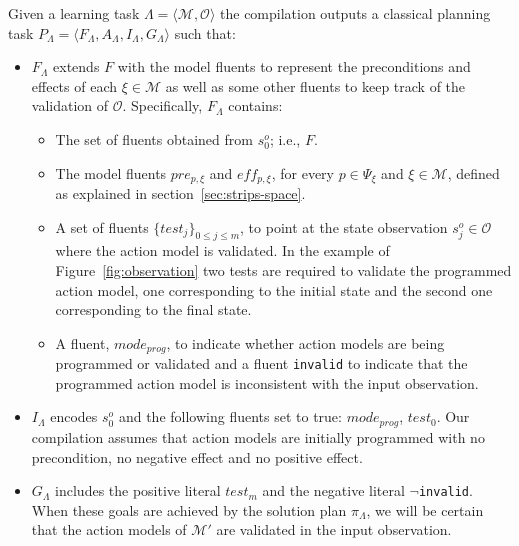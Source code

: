 \documentclass[runningheads]{llncs}
\newcommand{\tup}[1]{{\langle #1 \rangle}}
\begin{document}
Given a learning task $\Lambda=\tup{\mathcal{M},{\mathcal O}}$ the compilation outputs a classical planning task $P_{\Lambda}=\tup{F_{\Lambda},A_{\Lambda},I_{\Lambda},G_{\Lambda}}$ such that:
\begin{itemize}
\item $F_{\Lambda}$ extends $F$ with the model fluents to represent the preconditions and effects of each $\xi\in\mathcal{M}$ as well as some other fluents to keep track of the validation of ${\mathcal O}$. Specifically, $F_{\Lambda}$ contains:
\begin{itemize}
\item The set of fluents obtained from $s_0^o$; i.e., $F$.
\item The model fluents $pre_{p,\xi}$ and $eff_{p,\xi}$, for every $p\in \Psi_{\xi}$ and $\xi \in \mathcal{M}$, defined as explained in section~\ref{sec:strips-space}.
\item A set of fluents $\{test_j\}_{0\leq j\leq m}$, to point at the state observation $s_j^o\in {\mathcal O}$ where the action model is validated. In the example of Figure~\ref{fig:observation} two tests are required to validate the programmed action model, one corresponding to the initial state and the second one corresponding to the final state.  
\item A fluent, $mode_{prog}$, to indicate whether action models are being programmed or validated and a fluent {\small\tt invalid} to indicate that the programmed action model is inconsistent with the input observation.
\end{itemize}

\item $I_{\Lambda}$ encodes $s_0^o$ and the following fluents set to true: $mode_{prog}$, $test_0$. Our compilation assumes that action models are initially programmed with no precondition, no negative effect and no positive effect.

\item $G_{\Lambda}$ includes the positive literal $test_m$ and the negative literal $\neg${\small\tt invalid}. When these goals are achieved by the solution plan $\pi_\Lambda$, we will be certain that the action models of $\mathcal{M'}$ are validated in the input observation.


\end{itemize}
\end{document}
